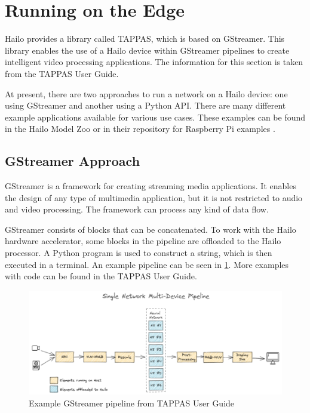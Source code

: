 \section{Running on the Edge}

Hailo provides a library called TAPPAS, which is based on GStreamer.  
This library enables the use of a Hailo device within GStreamer pipelines to create intelligent video processing applications.  
The information for this section is taken from the TAPPAS User Guide.  

At present, there are two approaches to run a network on a Hailo device:  
one using GStreamer and another using a Python API.  
There are many different example applications available for various use cases.  
These examples can be found in the Hailo Model Zoo \cite{hailo_model_zoo} or in their repository for Raspberry Pi examples \cite{hailo_rpi5_examples}.  

\subsection{GStreamer Approach}

GStreamer is a framework for creating streaming media applications.  
It enables the design of any type of multimedia application, but it is not restricted to audio and video processing.  
The framework can process any kind of data flow.  

GStreamer consists of blocks that can be concatenated.  
To work with the Hailo hardware accelerator, some blocks in the pipeline are offloaded to the Hailo processor.  
A Python program is used to construct a string, which is then executed in a terminal.  
An example pipeline can be seen in \cref{fig:hardware:gstreamerpipeline}.  
More examples with code can be found in the TAPPAS User Guide.

\begin{figure}[!h]
    \centering
    \includegraphics[width=\textwidth]{Images/Hardware/gstreamerExample.png}
    \caption{Example GStreamer pipeline from TAPPAS User Guide}
    \label{fig:hardware:gstreamerpipeline}
\end{figure}

